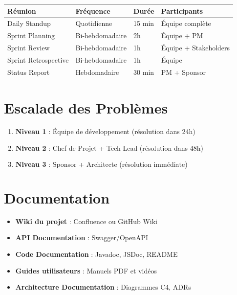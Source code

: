 \documentclass[12pt,a4paper,french]{report}
\begin{document}
\begin{table}[H]
\centering
\begin{tabularx}{\textwidth}{|l|l|l|X|}
\hline
\rowcolor{LightGray}
\textbf{Réunion} & \textbf{Fréquence} & \textbf{Durée} & \textbf{Participants} \\
\hline
Daily Standup & Quotidienne & 15 min & Équipe complète \\
\hline
Sprint Planning & Bi-hebdomadaire & 2h & Équipe + PM \\
\hline
Sprint Review & Bi-hebdomadaire & 1h & Équipe + Stakeholders \\
\hline
Sprint Retrospective & Bi-hebdomadaire & 1h & Équipe \\
\hline
Status Report & Hebdomadaire & 30 min & PM + Sponsor \\
\hline
\end{tabularx}
\end{table}

\section{Escalade des Problèmes}

\begin{enumerate}
    \item \textbf{Niveau 1} : Équipe de développement (résolution dans 24h)
    \item \textbf{Niveau 2} : Chef de Projet + Tech Lead (résolution dans 48h)
    \item \textbf{Niveau 3} : Sponsor + Architecte (résolution immédiate)
\end{enumerate}

\section{Documentation}

\begin{itemize}
    \item \textbf{Wiki du projet} : Confluence ou GitHub Wiki
    \item \textbf{API Documentation} : Swagger/OpenAPI
    \item \textbf{Code Documentation} : Javadoc, JSDoc, README
    \item \textbf{Guides utilisateurs} : Manuels PDF et vidéos
    \item \textbf{Architecture Documentation} : Diagrammes C4, ADRs
\end{itemize}
\end{document}
